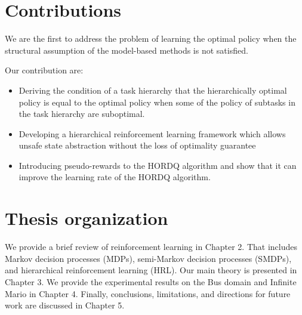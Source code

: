 \section{Contributions}
We are the first to address the problem of learning the optimal policy when
the structural assumption of the model-based methods is not satisfied.

Our contribution are: 
\begin{itemize}
\item Deriving the condition of a task hierarchy that the hierarchically optimal policy is equal to
      the optimal policy when some of the policy of subtasks in the task hierarchy are suboptimal.
\item Developing a hierarchical reinforcement learning framework which allows unsafe state abstraction
      without the loss of optimality guarantee
\item Introducing pseudo-rewards to the HORDQ algorithm and show that it can improve
      the learning rate of the HORDQ algorithm. 
\end{itemize}

\section{Thesis organization}
We provide a brief review of reinforcement learning in Chapter 2. 
That includes Markov decision processes (MDPs), semi-Markov decision processes (SMDPs),
and hierarchical reinforcement learning (HRL).
Our main theory is presented in Chapter 3. 
We provide the experimental results on the Bus domain and Infinite Mario in Chapter 4.
Finally, conclusions, limitations, and directions for future work are discussed in Chapter 5.


